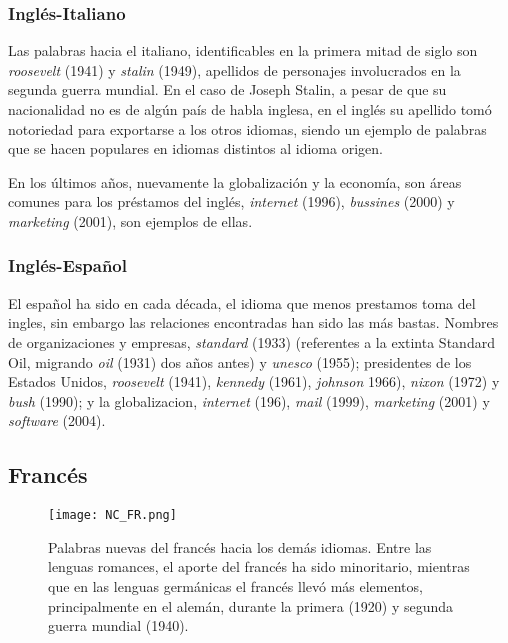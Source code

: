 \subsubsection*{Inglés-Italiano} %


Las palabras hacia el italiano, identificables en la primera mitad de siglo son \textit{roosevelt} (1941) y \textit{stalin} (1949), apellidos de personajes involucrados en la segunda guerra mundial. En el caso de Joseph Stalin, a pesar de que su nacionalidad no es de algún país de habla inglesa, en el inglés su apellido tomó notoriedad para exportarse a los otros idiomas, siendo un ejemplo de palabras que se hacen populares en idiomas distintos al idioma origen. 

En los últimos años, nuevamente la globalización y la economía, son áreas comunes para los préstamos del inglés, \textit{internet} (1996), \textit{bussines} (2000) y \textit{marketing} (2001), son ejemplos de ellas. 


\subsubsection*{Inglés-Español} 

El español ha sido en cada década,  el idioma que menos prestamos toma del ingles, sin embargo las relaciones encontradas han sido las más bastas.  Nombres de organizaciones y empresas,  \textit{standard} (1933) (referentes a la extinta Standard Oil, migrando \textit{oil} (1931) dos años antes) y \textit{unesco} (1955);  presidentes de los Estados Unidos,  \textit{roosevelt} (1941), \textit{kennedy} (1961), \textit{johnson} 1966),  \textit{nixon} (1972) y \textit{bush} (1990); y la globalizacion, \textit{internet} (196), \textit{mail} (1999), \textit{marketing} (2001) y \textit{software} (2004).   


\subsection{Francés} %

\begin{figure}[h!]
	\centering
	\texttt{[image: NC\_FR.png]}
	\label{fig.NC_FR}
	\caption{Palabras nuevas del francés hacia los demás idiomas. Entre las lenguas romances, el aporte del francés ha sido minoritario, mientras que en las lenguas germánicas el francés llevó más elementos, principalmente en el alemán, durante la primera (1920) y segunda guerra mundial (1940).}
	
	
\end{figure}

